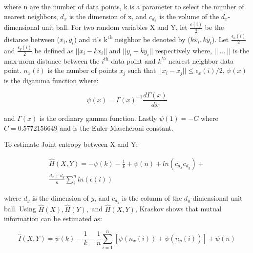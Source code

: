 \noindent where n are the number of data points, k is a parameter to select the number of nearest neighbors,  \(d_x\) is the dimension of x, and \(c_{d_x}\) is the volume of the \(d_x\)-dimensional unit ball. For two random variables X and Y, let \( \frac{\epsilon(i)}{2} \) be the distance between (\(x_i,y_i\)) and it's k\textsuperscript{th} neighbor be denoted by (\(kx_i,ky_i\)). Let \(\frac{\epsilon_x(i)}{2}\) and  \(\frac{\epsilon_y(i)}{2}\) be defined as \( ||x_i-kx_i ||\) and \( ||y_i-ky_i || \) respectively where,  \(||\ \ldots\ ||\) is the max-norm distance between the \(i^{th}\) data point and \(k^{th}\) nearest neighbor data point.  \(n_x(i)\) is the number of points \(x_j\) such that \(||x_i - x_j  || \leq \epsilon_x(i)/2\), \(\psi(x)\) is the digamma function where:

\begin{equation}
\psi(x) = \Gamma(x)^{-1} \frac{d\Gamma(x)} {dx}
\end{equation}

\noindent and  \(\Gamma(x)\) is the ordinary gamma function. Lastly \(\psi(1) = -C\) where \(C=0.5772156649\) and is the Euler-Mascheroni constant. %

To estimate Joint entropy between X and Y: 

\setlength{\arraycolsep}{0.0em}
\begin{eqnarray}
\hat{H}(X,Y) = - \psi(k) - \frac{1}{k} + \psi(n) + ln(c_{d_x} c_{d_y})  +  \nonumber\\
\frac{d_x + d_y}{n} \sum^n_i ln(\epsilon(i))
\end{eqnarray}
\setlength{\arraycolsep}{1pt}


\noindent where \(d_y\) is the dimension of \(y\), and \(c_{d_y}\) is the column of the \(d_y\)-dimensional unit ball. Using \(\hat{H}(X), \hat{H}(Y),\) and \(\hat{H}(X,Y)\), Kraskov shows that mutual information can be estimated as:

\begin{equation}
\label{KraskovEquation}
\hat{I}(X,Y) = \psi(k) - \frac{1}{k} - \frac{1}{n}  \sum_{i=1}^n [\psi(n_x(i)) + \psi(n_y(i))] + \psi(n)
\end{equation}

